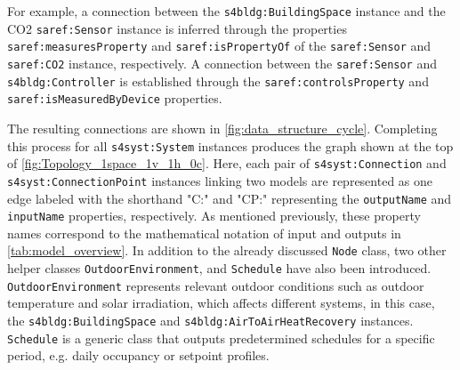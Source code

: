 For example, a connection between the \texttt{s4bldg:BuildingSpace} instance and the CO2 \texttt{saref:Sensor} instance is inferred through the properties \texttt{saref:measuresProperty} and \texttt{saref:isPropertyOf} of the \texttt{saref:Sensor} and \texttt{saref:CO2} instance, respectively. A connection between the \texttt{saref:Sensor} and \texttt{s4bldg:Controller} is established through the \texttt{saref:controlsProperty} and \texttt{saref:isMeasuredByDevice} properties. 



The resulting connections are shown in \autoref{fig:data_structure_cycle}. Completing this process for all \texttt{s4syst:System} instances produces the graph shown at the top of \autoref{fig:Topology_1space_1v_1h_0c}. Here, each pair of \texttt{s4syst:Connection} and \texttt{s4syst:ConnectionPoint} instances linking two models are represented as one edge labeled with the shorthand "C:"  and "CP:" representing the \texttt{outputName} and \texttt{inputName} properties, respectively. As mentioned previously, these property names correspond to the mathematical notation of input and outputs in \autoref{tab:model_overview}. In addition to the already discussed \texttt{Node} class, two other helper classes \texttt{OutdoorEnvironment}, and \texttt{Schedule} have also been introduced. \texttt{OutdoorEnvironment} represents relevant outdoor conditions such as outdoor temperature and solar irradiation, which affects different systems, in this case, the \texttt{s4bldg:BuildingSpace} and \texttt{s4bldg:AirToAirHeatRecovery} instances. \texttt{Schedule} is a generic class that outputs predetermined schedules for a specific period, e.g. daily occupancy or setpoint profiles. 



